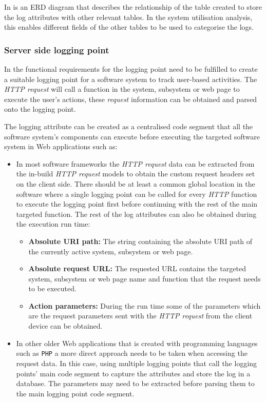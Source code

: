 In  is an ERD diagram that describes the relationship of the table created to store the log attributes with other relevant tables. In the system utilisation analysis, this enables different fields of the other tables to be used to categorise the logs. 

\clearpage

\subsubsection{Server side logging point}\label{sec:ch2_serverSideLoggingpoint}
In  the functional requirements for the logging point need to be fulfilled to create a suitable logging point for a software system to track user-based activities. The \textit{HTTP request} will call a function in the system, subsystem or web page to execute the user's actions, these \textit{request} information can be obtained and parsed onto the logging point.\par The logging attribute can be created as a centralised code segment that all the software system's components can execute before executing the targeted software system in Web applications such as:

\begin{itemize}
	\item In most software frameworks the \textit{HTTP request} data can be extracted from the in-build \textit{HTTP request} models to obtain the custom request headers set on the client side. There should be at least a common global location in the software where a single logging point can be called for every \textit{HTTP} function to execute the logging point first before continuing with the rest of the main targeted function. The rest of the log attributes can also be obtained during the execution run time:
	\begin{itemize}
		\item \textbf{Absolute URI path:} The string containing the absolute URI path of the currently active system, subsystem or web page. 
		\item \textbf{Absolute request URL:} The requested URL contains the targeted system, subsystem or web page name and function that the request needs to be executed. 
		\item \textbf{Action parameters:} During the run time some of the parameters which are the request parameters sent with the \textit{HTTP request} from the client device can be obtained.
	\end{itemize}
	\item In other older Web applications that is created with programming languages such as \texttt{PHP} a more direct approach needs to be taken when accessing the request data. In this case, using multiple logging points that call the logging points' main code segment to capture the attributes and store the log in a database. The parameters may need to be extracted before parsing them to the main logging point code segment.
\end{itemize}


